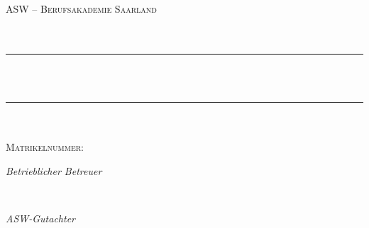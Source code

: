 \makeatletter
\begin{titlepage} 
	\newcommand{\HRule}{\rule{\linewidth}{0.5mm}}
	
	\center 
	\vspace*{1cm}
	
	
	\textsc{\LARGE ASW -- Berufsakademie Saarland}\\[1.5cm]
	
	\textsc{\Large \varArbeit}\\[0.5cm]
	
	\textsc{\large \varStudiengang}\\[0.5cm]
	
	
	\HRule\\[1cm]
	
	{\huge\bfseries\@title}\\[0.6cm]
	
	\HRule\\[1cm]
	

	\textsc{\Large \@author}\\[0.5cm]

	\textsc{\large Matrikelnummer: \varMartrikelnummer}\\[2cm]

	
	\begin{minipage}{0.43\textwidth}
		\begin{flushleft}
			\large
			\textit{Betrieblicher Betreuer}\\
			\varBetrBetreuer
		\end{flushleft}
	\end{minipage}
	~
	\begin{minipage}{0.43\textwidth}
		\begin{flushright}
			\large
			\textit{ASW-Gutachter}\\
			\varASWGutachter
		\end{flushright}
	\end{minipage}
	

\end{titlepage}
